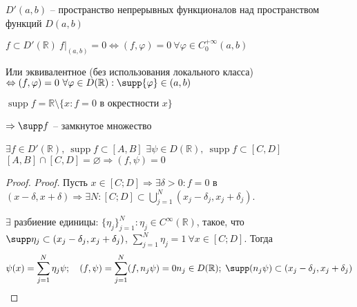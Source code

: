 \begin{enumerate}
\begin{definition}
  \end{definition}

  \(D'(a,b)\) -- пространство непрерывных функционалов над пространством
  функций \(D  (a,b)\)

  \begin{definition}

  \(f  \subset  D'(\mathbb{R} )  \ f|_{(a,b)}  =  0  \Leftrightarrow   (f, \varphi )  =  0  \  \forall  \varphi   \in  C_0^{+\infty }  (a, b)\)

  Или эквивалентное (без использования локального класса)
  \(\Leftrightarrow  (f, \varphi )=0\ \forall \varphi \in D(\mathbb{R} ): \supp {\varphi }\in (a, b)\)

  \end{definition}

  \begin{definition}

  \(\operatorname{supp} f  = \mathbb{R}   \setminus  \{ x: f  =  0  \text{ в окрестности  } x  \}\)

  \end{definition}

  \(\Rightarrow \supp f\) -- замкнутое множество

  \begin{lemma}

  \(\exists  f  \in  D'(\mathbb{R} ),  \  \operatorname{supp} f  \subset   [A, B]\)
  \(\exists  \psi   \in  D(\mathbb{R} ),  \  \operatorname{supp} f  \subset   [C, D]\)
  \([A, B]  \cap   [C, D]  =  \varnothing  \Rightarrow   (f, \psi )  =  0\)

  \begin{proof}

  \emph{Proof.} Пусть \(x\in [C;D]\Rightarrow \exists \delta >0: f=0\) в
  \((x-\delta , x+\delta )\Rightarrow \exists N: [C;D]\subset ⋃\limits_{j=1}^{N}(x_j-\delta _j, x_j+\delta _j)\).

  \(\exists \) разбиение единицы:
  \(\{\eta _j\}^N_{j=1}: \eta _j\in C^\infty (\mathbb{R} )\), такое, что
  \(\supp \eta _j \subset  (x_j - \delta _j, x_j + \delta _j)\),
  \(\sum_{j=1}^{N}\eta _j=1\ \forall x\in [C;D]\). Тогда \[
  \psi (x) = \sum\limits_{j=1}^N\eta _j\psi ;\quad (f, \psi ) = \sum_{j=1}^N(f, n_j\psi )=0\\
  n_j\in D(\mathbb{R} );\;\supp (n_j\psi )\subset (x_j-\delta _j, x_j + \delta _j) 
  \]

  \end{proof}

  \end{lemma}


\end{enumerate}
